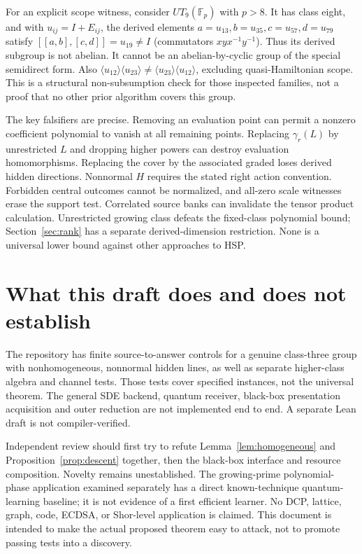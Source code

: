 \documentclass[11pt]{article}
\theoremstyle{remark}
\newcommand{\Fp}{\mathbb F_p}
\begin{document}
For an explicit scope witness, consider $UT_9(\Fp)$ with $p>8$.
It has class eight, and with $u_{ij}=I+E_{ij}$, the derived elements
$a=u_{13},b=u_{35},c=u_{57},d=u_{79}$ satisfy
$[[a,b],[c,d]]=u_{19}\ne I$ (commutators $xyx^{-1}y^{-1}$).
Thus its derived subgroup is not abelian. It cannot be an abelian-by-cyclic
group of the special semidirect form. Also
$\langle u_{12}\rangle\langle u_{23}\rangle\ne
\langle u_{23}\rangle\langle u_{12}\rangle$, excluding quasi-Hamiltonian
scope. This is a structural non-subsumption check for those inspected
families, not a proof that no other prior algorithm covers this group.

The key falsifiers are precise. Removing an evaluation point can permit a
nonzero coefficient polynomial to vanish at all remaining points. Replacing
$\gamma_r(L)$ by unrestricted $L$ and dropping higher powers can destroy
evaluation homomorphisms. Replacing the cover by the associated graded
loses derived hidden directions. Nonnormal $H$ requires the stated right
action convention. Forbidden central outcomes cannot be normalized, and
all-zero scale witnesses erase the support test. Correlated source banks
can invalidate the tensor product calculation. Unrestricted growing class
defeats the fixed-class polynomial bound; Section~\ref{sec:rank} has a
separate derived-dimension restriction. None is a universal lower bound against other
approaches to HSP.

\section{What this draft does and does not establish}
The repository has finite source-to-answer controls for a genuine
class-three group with nonhomogeneous, nonnormal hidden lines, as well as
separate higher-class algebra and channel tests. Those tests cover specified
instances, not the universal theorem. The general SDE backend, quantum
receiver, black-box presentation acquisition and outer reduction are not
implemented end to end. A separate Lean draft is not compiler-verified.

Independent review should first try to refute
Lemma~\ref{lem:homogeneous} and Proposition~\ref{prop:descent} together,
then the black-box interface and resource composition. Novelty remains
unestablished. The growing-prime polynomial-phase application examined
separately has a direct known-technique quantum-learning baseline; it is
not evidence of a first efficient learner. No DCP, lattice, graph, code,
ECDSA, or Shor-level application is claimed. This document is intended to
make the actual proposed theorem easy to attack, not to promote passing
tests into a discovery.
\end{document}
